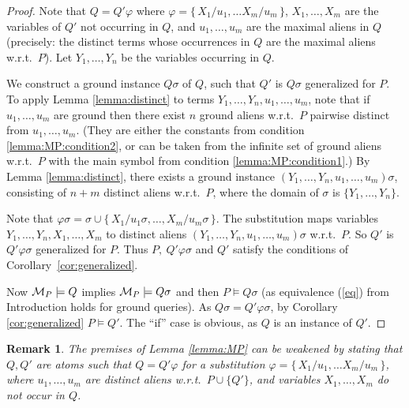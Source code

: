 \documentclass[a4paper]{tlp2}
\newtheorem{remark}[theorem]{Remark}
\newcommand*{\seq}[2][n]  {{#2_{1}, \allowbreak \ldots, \allowbreak #2_{#1}}}
\newcommand*{\M}{{\ensuremath{\cal M}}\xspace}
\begin{document}
\begin{proof}
Note that $Q= Q'\varphi$ where 
$\varphi=\{\, X_1/u_1,\ldots X_m/u_m\,\}$,  $\seq[m]X$ are the variables 
of $Q'$ not occurring in $Q$, and $\seq[m]u$ are the maximal aliens in $Q$ 
(precisely: the distinct terms whose occurrences in $Q$ are the maximal aliens
w.r.t.\ $P$).
Let $\seq[n] Y$ be the variables occurring in $Q$.


We construct a ground instance $Q\sigma$ of $Q$, such that 
$Q'$ is $Q\sigma$ generalized for $P$.
To apply Lemma \ref{lemma:distinct} to terms $\seq Y,\seq[m]u$,
note that if $\seq[m]u$ are ground then there exist $n$ ground aliens
w.r.t.\ $P$ pairwise distinct from $\seq[m]u$.
(They are either the constants from condition \ref{lemma:MP:condition2}, 
or can be taken from the infinite set of ground aliens w.r.t.\ $P$ with the main
 symbol from condition  \ref{lemma:MP:condition1}.)
By Lemma \ref{lemma:distinct}, 
there exists a ground instance  $(\seq Y,\seq[m]u)\sigma$, 
consisting of $n+m$ distinct aliens w.r.t.\ $P$,
where the domain of $\sigma$ is $\{\seq Y\}$.

Note that
$\varphi\sigma=\sigma \cup \{\, X_1/u_1\sigma,\ldots, X_m/u_m\sigma\,\} $.
The substitution
maps variables $\seq Y,\seq[m]X$ to distinct aliens 
$(\seq Y,\seq[m]u)\sigma$ w.r.t.\ $P$.
So $Q'$ is $Q'\varphi\sigma$ generalized for $P$.
Thus $P,\ Q'\varphi\sigma$ and $Q'$ satisfy the conditions of 
Corollary~\ref{cor:generalized}.


Now $\M_P\models Q$ implies $\M_P\models Q\sigma$ and then
$P\models Q\sigma$ 
(as equivalence (\ref{eq}) from Introduction holds for ground queries).
As $Q\sigma=Q'\varphi\sigma$, by
Corollary \ref{cor:generalized} $P\models Q'$.
The ``if'' case is obvious, as $Q$ is an instance of $Q'$.
\end{proof}


















\begin{remark}
  The premises of Lemma \ref{lemma:MP} can be weakened by
stating that $Q,Q'$ are atoms such that $Q=Q'\varphi$ for a substitution
$\varphi=\{\, X_1/u_1,\ldots X_m/u_m\,\}$,
where $\seq[m]u$ are distinct aliens w.r.t.\ $P\cup\{Q'\}$, and variables
$\seq[m]X$ do not occur in $Q$.
\end{remark}
\end{document}
